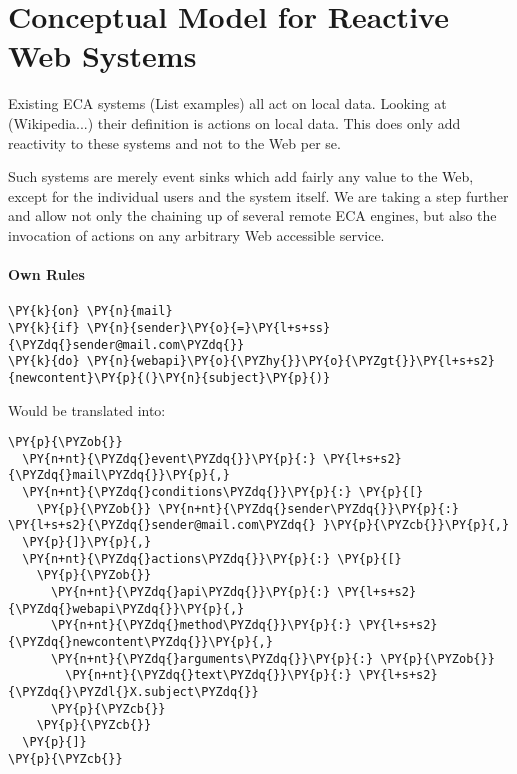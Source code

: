 
\chapter{Conceptual Model for Reactive Web Systems}
%


%





Existing ECA systems (List examples) all act on local data.
Looking at (Wikipedia...) their definition is actions on local data.
This does only add reactivity to these systems and not to the Web per se.

Such systems are merely event sinks which add fairly any value to the Web, except for the individual users and the system itself.
We are taking a step further and allow not only the chaining up of several remote ECA engines, but also the invocation of actions on any arbitrary Web accessible service.


\newpage

\subsubsection{Own Rules}
\begin{Verbatim}[fontsize=\small,commandchars=\\\{\}]
\PY{k}{on} \PY{n}{mail}
\PY{k}{if} \PY{n}{sender}\PY{o}{=}\PY{l+s+ss}{\PYZdq{}sender@mail.com\PYZdq{}}
\PY{k}{do} \PY{n}{webapi}\PY{o}{\PYZhy{}}\PY{o}{\PYZgt{}}\PY{l+s+s2}{newcontent}\PY{p}{(}\PY{n}{subject}\PY{p}{)}
\end{Verbatim}

Would be translated into:

\begin{Verbatim}[fontsize=\small,commandchars=\\\{\}]
\PY{p}{\PYZob{}}
  \PY{n+nt}{\PYZdq{}event\PYZdq{}}\PY{p}{:} \PY{l+s+s2}{\PYZdq{}mail\PYZdq{}}\PY{p}{,}
  \PY{n+nt}{\PYZdq{}conditions\PYZdq{}}\PY{p}{:} \PY{p}{[}
    \PY{p}{\PYZob{}} \PY{n+nt}{\PYZdq{}sender\PYZdq{}}\PY{p}{:} \PY{l+s+s2}{\PYZdq{}sender@mail.com\PYZdq{} }\PY{p}{\PYZcb{}}\PY{p}{,}
  \PY{p}{]}\PY{p}{,}
  \PY{n+nt}{\PYZdq{}actions\PYZdq{}}\PY{p}{:} \PY{p}{[}
    \PY{p}{\PYZob{}}
      \PY{n+nt}{\PYZdq{}api\PYZdq{}}\PY{p}{:} \PY{l+s+s2}{\PYZdq{}webapi\PYZdq{}}\PY{p}{,}
      \PY{n+nt}{\PYZdq{}method\PYZdq{}}\PY{p}{:} \PY{l+s+s2}{\PYZdq{}newcontent\PYZdq{}}\PY{p}{,}
      \PY{n+nt}{\PYZdq{}arguments\PYZdq{}}\PY{p}{:} \PY{p}{\PYZob{}}
        \PY{n+nt}{\PYZdq{}text\PYZdq{}}\PY{p}{:} \PY{l+s+s2}{\PYZdq{}\PYZdl{}X.subject\PYZdq{}}
      \PY{p}{\PYZcb{}}
    \PY{p}{\PYZcb{}}
  \PY{p}{]}
\PY{p}{\PYZcb{}}
\end{Verbatim}

